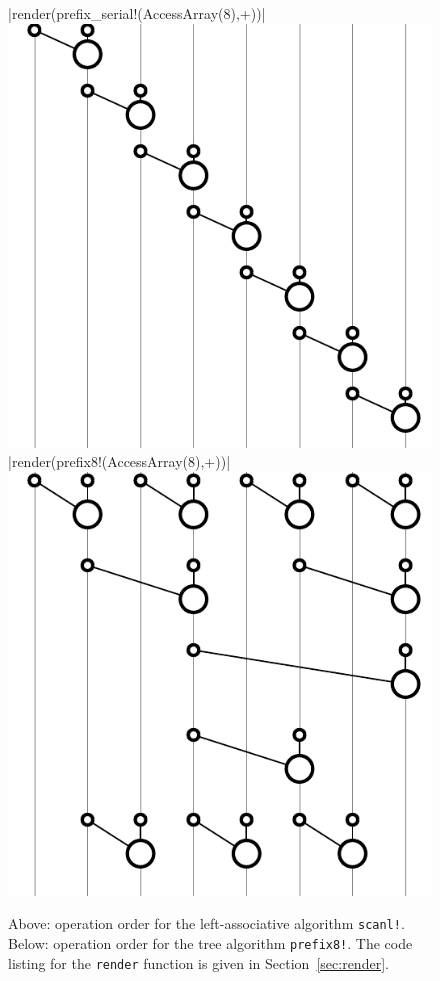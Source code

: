 \documentclass{sig-alternate}
\newcommand{\code}[1]{\texttt{#1}}
\begin{document}
\begin{figure}
  \centering

  |render(prefix_serial!(AccessArray(8),+))|
  \includegraphics{serial}
  \vspace{12 pt}
  |render(prefix8!(AccessArray(8),+))|
  \includegraphics{tree}
  \caption{Above: operation order for the left-associative algorithm \code{scanl!}.
           Below: operation order for the tree algorithm \code{prefix8!}.
           The code listing for the \code{render} function is given in Section~\ref{sec:render}.}
  \label{fig:gates}
\end{figure}
\end{document}
